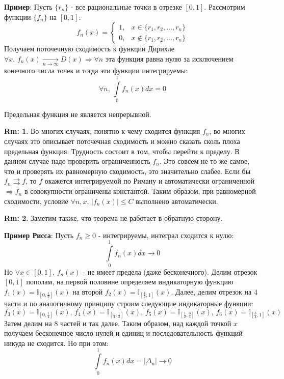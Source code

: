 \documentclass[12pt]{article}
\newcommand{\MTI}{\mathbb{I}}
\theoremstyle{definition}
\newtheorem{rem}{Rm:}
\newcommand{\ddint}[2]{\displaystyle\int\limits_{#1}^{#2}}
\newcommand{\uconv}[1]{\overset{#1}{\rightrightarrows}}
\begin{document}
\textbf{Пример}: Пусть $\{r_n\}$ - все рациональные точки в отрезке $[0,1]$. Рассмотрим функции $\{f_n\}$ на $[0,1]$: 
$$
	f_n(x) = 
	\begin{cases}
		1, & x \in \{r_1 , r_2, \dotsc, r_n\}\\
		0, & x \notin \{r_1 , r_2, \dotsc, r_n\}
	\end{cases}
$$
Получаем поточечную сходимость к функции Дирихле $\forall x, \, f_n(x) \xrightarrow[n \to \infty]{}D(x) \Rightarrow \forall n$ эта функция равна нулю за исключением конечного числа точек и тогда эти функции интегрируемы:
$$
	\forall n, \, \ddint{0}{1}f_n(x)dx = 0
$$

Предельная функция не является непрерывной.

\begin{rem}
	Во многих случаях, понятно к чему сходится функция $f_n$, во многих случаях это описывает поточечная сходимость и можно сказать сколь плоха предельная функция. Трудность состоит в том, чтобы перейти к пределу. В данном случае надо проверить ограниченность $f_n$. Это совсем не то же самое, что и проверять их равномерную сходимость, это значительно слабее. Если бы $f_n \uconv{} f$, то $f$ окажется интегрируемой по Риману и автоматически ограниченной $\Rightarrow f_n$ в совокупности ограничены константой. Таким образом, при равномерной сходимости, условие $\forall n, x, \, |f_n(x)| \leq C$ выполнено автоматически.
\end{rem}

\begin{rem}
	Заметим также, что теорема не работает в обратную сторону.
\end{rem}
\textbf{Пример Рисса}: Пусть $f_n \geq 0$ - интегрируемы, интеграл сходится к нулю:
$$
	\ddint{0}{1}f_n(x)dx \to 0
$$ 
Но $\forall x\in[0,1],\, f_n(x)$ - не имеет предела (даже бесконечного). Делим отрезок $[0,1]$ пополам, на первой половине определяем индикаторную функцию $f_1(x) = \MTI_{\left[0,\frac{1}{2}\right]}(x)$ на второй $f_2(x) = \MTI_{\left[\frac{1}{2},1\right]}(x)$. Далее, делим отрезок на $4$ части и по аналогичному принципу строим следующие индикаторные функции:
$$
	f_3(x) = \MTI_{\left[0,\frac{1}{4}\right]}(x), \, 
	f_4(x) = \MTI_{\left[\frac{1}{4},\frac{1}{2}\right]}(x), \, 
	f_5(x) = \MTI_{\left[\frac{1}{2},\frac{3}{4}\right]}(x), \, 
	f_6(x) = \MTI_{\left[\frac{3}{4},1\right]}(x)
$$
Затем делим на $8$ частей и так далее. Таким образом, над каждой точкой $x$ получаем бесконечное число нулей и единиц и последовательность функций никуда не сходится. Но при этом:
$$
	\ddint{0}{1}f_n(x)dx = |\Delta_n| \to 0
$$
\end{document}
